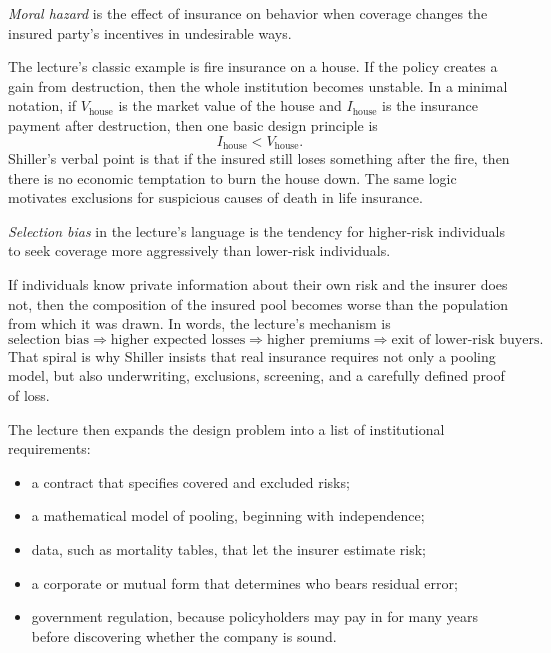 \begin{definition}
\emph{Moral hazard} is the effect of insurance on behavior when coverage changes the insured party's incentives in undesirable ways.
\end{definition}

The lecture's classic example is fire insurance on a house. If the policy creates a gain from destruction, then the whole institution becomes unstable. In a minimal notation, if \(V_{\text{house}}\) is the market value of the house and \(I_{\text{house}}\) is the insurance payment after destruction, then one basic design principle is
\begin{equation}
I_{\text{house}} < V_{\text{house}}.
\end{equation}
Shiller's verbal point is that if the insured still loses something after the fire, then there is no economic temptation to burn the house down. The same logic motivates exclusions for suspicious causes of death in life insurance.

\begin{definition}
\emph{Selection bias} in the lecture's language is the tendency for higher-risk individuals to seek coverage more aggressively than lower-risk individuals.
\end{definition}

If individuals know private information about their own risk and the insurer does not, then the composition of the insured pool becomes worse than the population from which it was drawn. In words, the lecture's mechanism is
\begin{equation}
\text{selection bias} \Longrightarrow \text{higher expected losses} \Longrightarrow \text{higher premiums} \Longrightarrow \text{exit of lower-risk buyers}.
\end{equation}
That spiral is why Shiller insists that real insurance requires not only a pooling model, but also underwriting, exclusions, screening, and a carefully defined proof of loss.

The lecture then expands the design problem into a list of institutional requirements:
\begin{itemize}
\item a contract that specifies covered and excluded risks;
\item a mathematical model of pooling, beginning with independence;
\item data, such as mortality tables, that let the insurer estimate risk;
\item a corporate or mutual form that determines who bears residual error;
\item government regulation, because policyholders may pay in for many years before discovering whether the company is sound.
\end{itemize}

